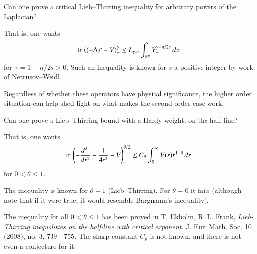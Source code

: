\documentclass[12pt,letterpaper, reqno]{aimpl}
\begin{document}
\begin{problemblock}
\begin{problem}[2.73]
 Can one prove a critical Lieb--Thirring inequality for arbitrary powers of
the Laplacian?
\end{problem}

That is, one wants
\[
\text{tr\,} \left( (-\Delta)^s - V \right)_-^\gamma \leq
L_{\gamma,n} \int_{\mathbb R^n} V_+^{\gamma + n/2s} \, dx
\]
for $\gamma = 1 - n/2s > 0$. Such an inequality is known for $s$ a
positive integer by work of Netrusov--Weidl.


\begin{remark}
 Regardless of whether these operators have
physical significance, the higher order situation can help shed
light on what makes the second-order case work.
\end{remark}

\end{problemblock}


\begin{problemblock}
\begin{problem}[2.76]
 Can one prove a Lieb--Thirring bound with a Hardy
weight, on the half-line?
\end{problem}

 That is, one wants
\[
\text{tr\,} \left( -\frac{d^2\ }{dr^2} - \frac{1}{4r^2} - V
\right)_{\! -}^{\theta/2}  \leq C_\theta \int_0^\infty V(r)
r^{1-\theta}\, dr
\]
for $0 < \theta \leq 1$.
\begin{remark}
The inequality is known for $\theta=1$
(Lieb--Thirring). For $\theta=0$ it fails (although note that if it
were true, it would resemble Bargmann's inequality).
\end{remark}

\begin{remark}
 The inequality for all $0 < \theta \leq 1$ has been
proved in T. Ekholm, R. L. Frank,  \emph{Lieb-Thirring inequalities on
the half-line with critical exponent}. J. Eur. Math. Soc. 10 (2008),
no. 3, 739 - 755. The sharp constant
$C_\theta$ is not known, and there is not even a conjecture for it.
\end{remark}

\end{problemblock}
\end{document}
